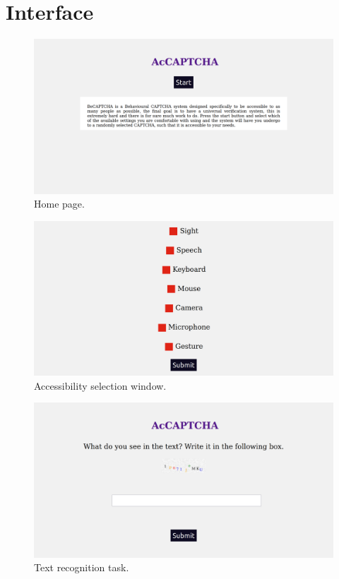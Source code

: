 \section{Interface}

\begin{figure}[h!t]
    \centering
    \includegraphics[scale=0.17]{assets/images/home.png}
    \caption{Home page.}
    \label{fig:gui:home}
\end{figure}

\begin{figure}[h!t]
    \centering
    \includegraphics[scale=0.17]{assets/images/configure.png}
    \caption{Accessibility selection window.}
    \label{fig:gui:configure}
\end{figure}

\begin{figure}[h!t]
    \centering
    \includegraphics[scale=0.17]{assets/images/text_recognition.png}
    \caption{Text recognition task.}
    \label{fig:gui:text_recognition}
\end{figure}

